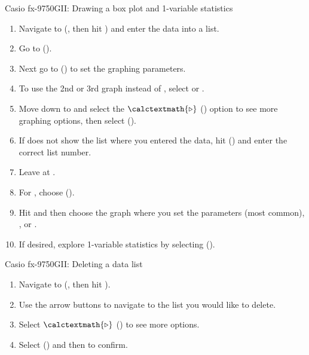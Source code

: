 \begin{onebox}{ Casio fx-9750GII: Drawing a box plot and 1-variable statistics}
\begin{enumerate}
\setlength{\itemsep}{0mm}
\item Navigate to  (, then hit ) and enter the data into a list.
\item Go to  ().
\item Next go to  () to set the graphing parameters.
\item To use the 2nd or 3rd graph instead of , select  or .
\item Move down to  and select the $\calctextmath{\triangleright}$ () option to see more graphing options, then select  ().
\item If  does not show the list where you entered the data, hit  () and enter the correct list number.
\item Leave  at .
\item For , choose  ().
\item Hit  and then choose the graph where you set the parameters  (most common), , or .
\item If desired, explore 1-variable statistics by selecting  ().
\end{enumerate}
\end{onebox}

\begin{onebox}{ Casio fx-9750GII: Deleting a data list}
\begin{enumerate}
\setlength{\itemsep}{0mm}
\item Navigate to  (, then hit ).
\item Use the arrow buttons to navigate to the list you would like to delete.
\item Select $\calctextmath{\triangleright}$ () to see more options.
\item Select  () and then  to confirm.
\end{enumerate}
\end{onebox}

